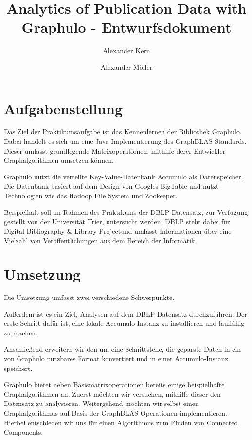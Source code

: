 \documentclass{article}
\title{Analytics of Publication Data with Graphulo - Entwurfsdokument}
\author{Alexander Kern \and Alexander Möller}
\begin{document}
\maketitle
	
\section{Aufgabenstellung}

Das Ziel der Praktikumsaufgabe ist das Kennenlernen der Bibliothek Graphulo. Dabei handelt es sich um eine Java-Implementierung des GraphBLAS-Standards. Dieser umfasst grundlegende Matrixoperationen, mithilfe derer Entwickler Graphalgorithmen umsetzen können. \cite{graph}

Graphulo nutzt die verteilte Key-Value-Datenbank Accumulo als Datenspeicher. Die Datenbank basiert auf dem Design von Googles BigTable und nutzt Technologien wie das Hadoop File System und Zookeeper. \cite{acc} 

Beispielhaft soll im Rahmen des Praktikums der DBLP-Datensatz, zur Verfügung gestellt von der Universität Trier, untersucht werden. DBLP steht dabei für \glqq Digital Bibliography \& Library Project\grqq und umfasst Informationen über eine Vielzahl von Veröffentlichungen aus dem Bereich der Informatik. \cite{dblp}


\section{Umsetzung}

Die Umsetzung umfasst zwei verschiedene Schwerpunkte. 

Außerdem ist es ein Ziel, Analysen auf dem DBLP-Datensatz durchzuführen. Der erste Schritt dafür ist, eine lokale Accumulo-Instanz zu installieren und lauffähig zu machen.

Anschließend erweitern wir den \cite{pars} um eine Schnittstelle, die geparste Daten in ein von Graphulo nutzbares Format konvertiert und in einer Accumulo-Instanz speichert.

Graphulo bietet neben Basismatrixoperationen bereits einige beispielhafte Graphalgorithmen an. Zuerst möchten wir versuchen, mithilfe dieser den Datensatz zu analysieren. Weitergehend möchten wir selbst einen Graphalgorithmus auf Basis der GraphBLAS-Operationen implementieren. Hierbei entschieden wir uns für einen Algorithmus zum Finden von Connected Components. 
\end{document}
